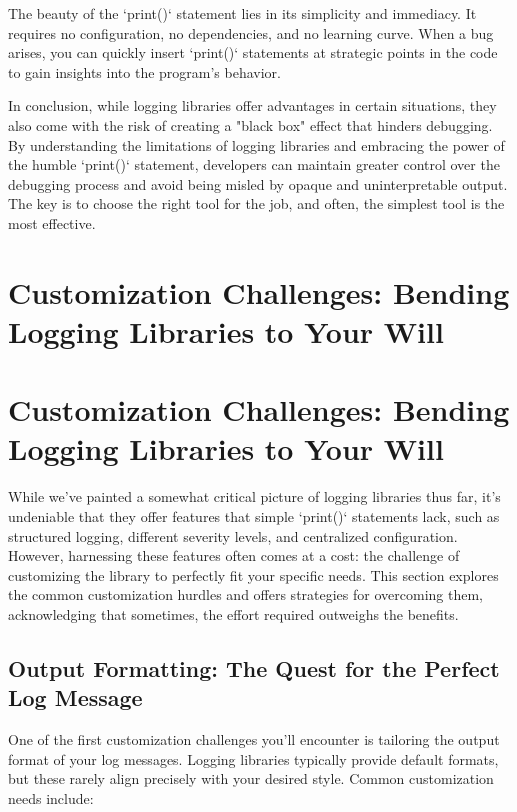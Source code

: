 \documentclass{article}
\begin{document}
{{{{The beauty of the `print()` statement lies in its simplicity and immediacy. It requires no configuration, no dependencies, and no learning curve. When a bug arises, you can quickly insert `print()` statements at strategic points in the code to gain insights into the program's behavior.

In conclusion, while logging libraries offer advantages in certain situations, they also come with the risk of creating a "black box" effect that hinders debugging. By understanding the limitations of logging libraries and embracing the power of the humble `print()` statement, developers can maintain greater control over the debugging process and avoid being misled by opaque and uninterpretable output. The key is to choose the right tool for the job, and often, the simplest tool is the most effective.

\newpage

\section*{Customization Challenges: Bending Logging Libraries to Your Will} %
\label{chapter-7-8-Customization_Challenges__Bending_Loggin}

\section*{Customization Challenges: Bending Logging Libraries to Your Will}

While we've painted a somewhat critical picture of logging libraries thus far, it's undeniable that they offer features that simple `print()` statements lack, such as structured logging, different severity levels, and centralized configuration. However, harnessing these features often comes at a cost: the challenge of customizing the library to perfectly fit your specific needs. This section explores the common customization hurdles and offers strategies for overcoming them, acknowledging that sometimes, the effort required outweighs the benefits.

\subsection*{Output Formatting: The Quest for the Perfect Log Message}

One of the first customization challenges you'll encounter is tailoring the output format of your log messages. Logging libraries typically provide default formats, but these rarely align precisely with your desired style. Common customization needs include:

}}}}
\end{document}
